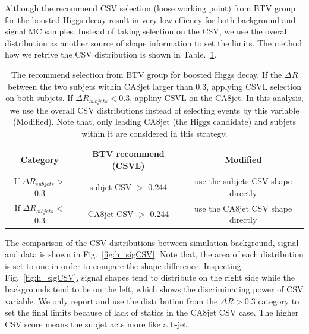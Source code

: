 Although the recommend CSV selection (loose working point) from BTV group\cite{BTV-13-001} for the boosted Higgs decay result in very low effiency for both background and signal MC samples. Instead of taking selection on the CSV, we use the overall distribution as another source of shape information to set the limits. The method how we retrive the CSV distribution is shown in Table.~\ref{tab:CSVsel}.

\begin{center}
  \begin{table}[h]
    \begin{center}
      \begin{tabular}{|c|c|c|}
        \hline
        \textbf{Category} & \textbf{BTV recommend (CSVL)} & \textbf{Modified} \\ \hline
        If $\Delta R_{subjets} > $ 0.3 & subjet CSV $>$ 0.244 & use the subjets CSV shape directly\\
        If $\Delta R_{sibjets} < $ 0.3 & CA8jet CSV $>$ 0.244 & use the CA8jet CSV shape directly\\
        \hline
      \end{tabular}
    \end{center}
    \caption{\label{tab:CSVsel}The recommend selection from BTV group for boosted Higgs decay. If the $\Delta R$ between the two subjets within CA8jet larger than 0.3, applying CSVL selection on both subjets. If $\Delta R_{subjets} < 0.3$, appliny CSVL on the CA8jet. In this analysis, we use the overall CSV distributions instead of selecting events by this variable (Modified). Note that, only leading CA8jet (the Higgs candidate) and subjets within it are considered in this strategy.}
  \end{table}
\end{center}

The comparison of the CSV distributions between simulation background, signal and data is shown in Fig.~\ref{fig:h_sigCSV}. Note that, the area of each distribution is set to one in order to compare the shape difference. Inspecting Fig.~\ref{fig:h_sigCSV}, signal shapes tend to distribute on the right side while the backgrounds tend to be on the left, which shows the discriminating power of CSV variable. We only report and use the distribution from the $\Delta R > 0.3$ category to set the final limits because of lack of statics in the CA8jet CSV case. The higher CSV score means the subjet acts more like a b-jet.

